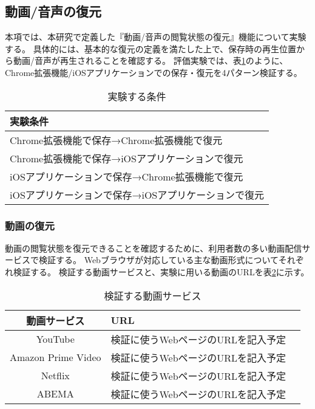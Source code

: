 \subsection{動画/音声の復元}
本項では、本研究で定義した『動画/音声の閲覧状態の復元』機能について実験する。
具体的には、基本的な復元の定義を満たした上で、保存時の再生位置から動画/音声が再生されることを確認する。
評価実験では、表\ref{tb:evl-video-audio-conditions}のように、Chrome拡張機能/iOSアプリケーションでの保存・復元を4パターン検証する。

\begin{table}[htbp]
  \label{tb:evl-video-audio-conditions}
  \caption{実験する条件}
  \begin{center}
    \begin{tabular}{|l|}
    \hline
    実験条件  \\ \hline
    Chrome拡張機能で保存→Chrome拡張機能で復元 \\ \hline
    Chrome拡張機能で保存→iOSアプリケーションで復元 \\ \hline
    iOSアプリケーションで保存→Chrome拡張機能で復元 \\ \hline
    iOSアプリケーションで保存→iOSアプリケーションで復元 \\ \hline
    \end{tabular}
  \end{center}
\end{table}

\subsubsection{動画の復元}
動画の閲覧状態を復元できることを確認するために、利用者数の多い動画配信サービスで検証する。
Webブラウザが対応している主な動画形式についてそれぞれ検証する。
検証する動画サービスと、実験に用いる動画のURLを表\ref{tb:evl-video-check-list}に示す。

\begin{table}[htbp]
  \begin{center}
    \caption{検証する動画サービス}
    \label{tb:evl-video-check-list}
    \begin{tabular}{|c|l|l|}
      \hline
      動画サービス & URL \\\hline\hline
      YouTube & 検証に使うWebページのURLを記入予定 \\\hline
      Amazon Prime Video & 検証に使うWebページのURLを記入予定 \\\hline
      Netflix & 検証に使うWebページのURLを記入予定 \\\hline
      ABEMA & 検証に使うWebページのURLを記入予定 \\\hline
    \end{tabular}
  \end{center}
\end{table}
